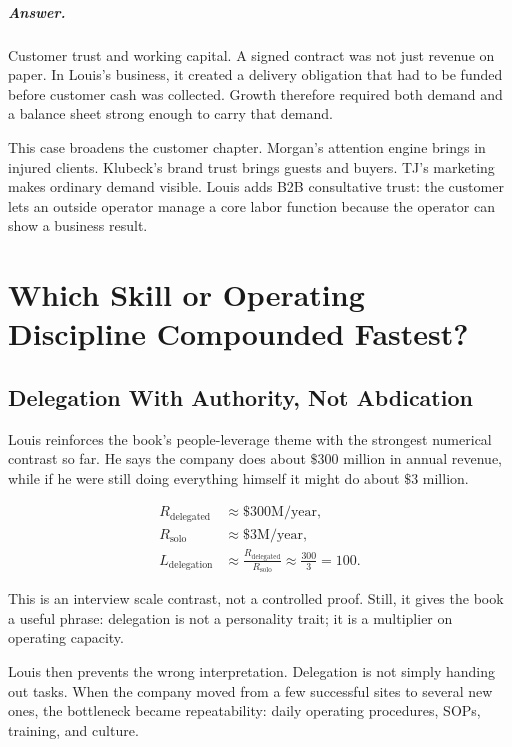 \documentclass[11pt,oneside]{book}
\begin{document}
\paragraph{Answer.}
Customer trust and working capital. A signed contract was not just revenue on paper. In Louis's business, it created a delivery obligation that had to be funded before customer cash was collected. Growth therefore required both demand and a balance sheet strong enough to carry that demand.

This case broadens the customer chapter. Morgan's attention engine brings in injured clients. Klubeck's brand trust brings guests and buyers. TJ's marketing makes ordinary demand visible. Louis adds B2B consultative trust: the customer lets an outside operator manage a core labor function because the operator can show a business result.

\chapter{Which Skill or Operating Discipline Compounded Fastest?}

\section{Delegation With Authority, Not Abdication}

Louis reinforces the book's people-leverage theme with the strongest numerical contrast so far. He says the company does about \(\$300\) million in annual revenue, while if he were still doing everything himself it might do about \(\$3\) million.

\begin{align}
R_{\mathrm{delegated}} &\approx \$300\mathrm{M/year},\\
R_{\mathrm{solo}} &\approx \$3\mathrm{M/year},\\
L_{\mathrm{delegation}}
&\approx
\frac{R_{\mathrm{delegated}}}{R_{\mathrm{solo}}}
\approx
\frac{300}{3}
=
100.
\end{align}

This is an interview scale contrast, not a controlled proof. Still, it gives the book a useful phrase: delegation is not a personality trait; it is a multiplier on operating capacity.

Louis then prevents the wrong interpretation. Delegation is not simply handing out tasks. When the company moved from a few successful sites to several new ones, the bottleneck became repeatability: daily operating procedures, SOPs, training, and culture.
\end{document}
